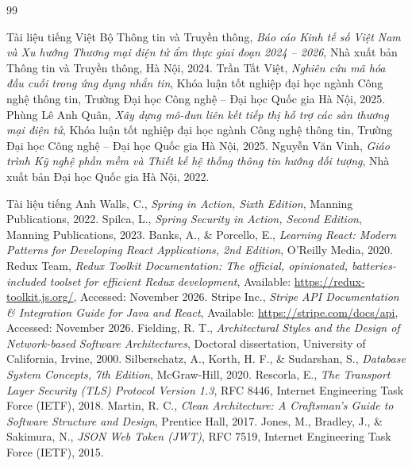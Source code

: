 \documentclass{uetgraduation}
\begin{document}
\begin{thebibliography}{99}
\begin{bibsection}{Tài liệu tiếng Việt}
 Bộ Thông tin và Truyền thông, \textit{Báo cáo Kinh tế số Việt Nam và Xu hướng Thương mại điện tử ẩm thực giai đoạn 2024 -- 2026}, Nhà xuất bản Thông tin và Truyền thông, Hà Nội, 2024.
 Trần Tất Việt, \textit{Nghiên cứu mã hóa đầu cuối trong ứng dụng nhắn tin}, Khóa luận tốt nghiệp đại học ngành Công nghệ thông tin, Trường Đại học Công nghệ -- Đại học Quốc gia Hà Nội, 2025.
 Phùng Lê Anh Quân, \textit{Xây dựng mô-đun liên kết tiếp thị hỗ trợ các sàn thương mại điện tử}, Khóa luận tốt nghiệp đại học ngành Công nghệ thông tin, Trường Đại học Công nghệ -- Đại học Quốc gia Hà Nội, 2025.
 Nguyễn Văn Vinh, \textit{Giáo trình Kỹ nghệ phần mềm và Thiết kế hệ thống thông tin hướng đối tượng}, Nhà xuất bản Đại học Quốc gia Hà Nội, 2022.
\end{bibsection}

\begin{bibsection}{Tài liệu tiếng Anh}
 Walls, C., \textit{Spring in Action, Sixth Edition}, Manning Publications, 2022.
 Spilca, L., \textit{Spring Security in Action, Second Edition}, Manning Publications, 2023.
 Banks, A., \& Porcello, E., \textit{Learning React: Modern Patterns for Developing React Applications, 2nd Edition}, O'Reilly Media, 2020.
 Redux Team, \textit{Redux Toolkit Documentation: The official, opinionated, batteries-included toolset for efficient Redux development}, Available: \url{https://redux-toolkit.js.org/}, Accessed: November 2026.
 Stripe Inc., \textit{Stripe API Documentation \& Integration Guide for Java and React}, Available: \url{https://stripe.com/docs/api}, Accessed: November 2026.
 Fielding, R. T., \textit{Architectural Styles and the Design of Network-based Software Architectures}, Doctoral dissertation, University of California, Irvine, 2000.
 Silberschatz, A., Korth, H. F., \& Sudarshan, S., \textit{Database System Concepts, 7th Edition}, McGraw-Hill, 2020.
 Rescorla, E., \textit{The Transport Layer Security (TLS) Protocol Version 1.3}, RFC 8446, Internet Engineering Task Force (IETF), 2018.
 Martin, R. C., \textit{Clean Architecture: A Craftsman's Guide to Software Structure and Design}, Prentice Hall, 2017.
 Jones, M., Bradley, J., \& Sakimura, N., \textit{JSON Web Token (JWT)}, RFC 7519, Internet Engineering Task Force (IETF), 2015.
\end{bibsection}
\end{thebibliography}
\end{document}
